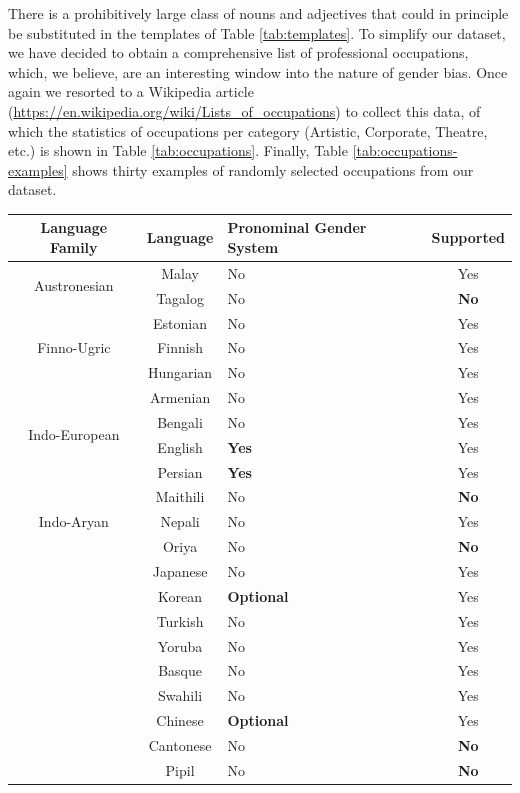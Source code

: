 \documentclass{article}
\begin{document}
There is a prohibitively large class of nouns and adjectives that could in principle be substituted in the templates of Table \ref{tab:templates}. To simplify our dataset, we have decided to obtain a comprehensive list of professional occupations, which, we believe, are an interesting window into the nature of gender bias. Once again we resorted to a Wikipedia article (\url{https://en.wikipedia.org/wiki/Lists_of_occupations}) to collect this data, of which the statistics of occupations per category (Artistic, Corporate, Theatre, etc.) is shown in Table \ref{tab:occupations}. Finally, Table \ref{tab:occupations-examples} shows thirty examples of randomly selected occupations from our dataset.

\begin{table}[H]
	\centering
	\begin{tabular}{|c|c|m{3cm}|c|}
	\hline
	Language Family & Language & Pronominal Gender System & Supported \\ \hline \hline
	\multirow{2}{*}{Austronesian} & Malay & No & Yes \\
	& Tagalog & No & \textbf{No} \\ \hline
	\multirow{3}{*}{Finno-Ugric} & Estonian & No & Yes \\
	& Finnish & No & Yes\\
	& Hungarian & No & Yes \\ \hline
	\multirow{4}{*}{Indo-European} & Armenian & No & Yes \\
	& Bengali & No & Yes \\
	& English & \textbf{Yes} & Yes \\{}
	& Persian & \textbf{Yes} & Yes \\ \hline
	\multirow{3}{*}{Indo-Aryan} & Maithili & No & \textbf{No} \\
	& Nepali & No & Yes \\
	& Oriya & No & \textbf{No} \\ \hline
	\multirow{10}{*}{} & Japanese & No & Yes \\
	& Korean & \textbf{Optional} & Yes \\
	& Turkish & No & Yes \\
	& Yoruba & No & Yes \\
	& Basque & No & Yes \\
	& Swahili & No & Yes \\
	& Chinese & \textbf{Optional} & Yes \\
	& Cantonese & No & \textbf{No} \\
	& Pipil & No & \textbf{No} \\

\end{tabular}
\end{table}
\end{document}
